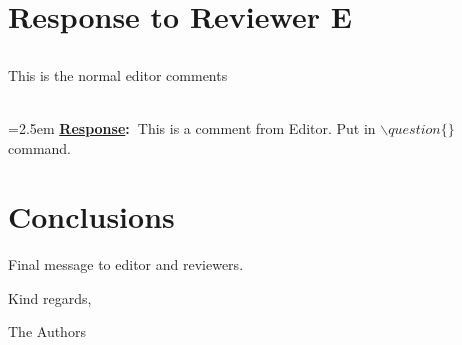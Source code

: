 \documentclass{article}
\newcommand{\answer}[1]{~\\\vspace{0.1em} \hangindent=2.5em \textbf{\textcolor{NavyBlue}{\uline{Response}:~}}\textcolor{NavyBlue}{#1}}
\newcommand\getcurrentref[1]{%
	\ifnumequal{\value{#1}}{0}
	{E}
	{\the\value{#1}}%
}
\newcommand{\getCurrentSectionNumber}{\getcurrentref{section}}
\begin{document}
	\section{Response to Reviewer \getCurrentSectionNumber}
	
	\subsection{} This is the normal editor comments
	
	\answer {This is a comment  from Editor. Put in $\backslash question \{\}$command.}
		
	\section{Conclusions}
	
	Final message to editor and reviewers.
	
	\hfill Kind regards,
	
	\hfill The Authors
\end{document}
